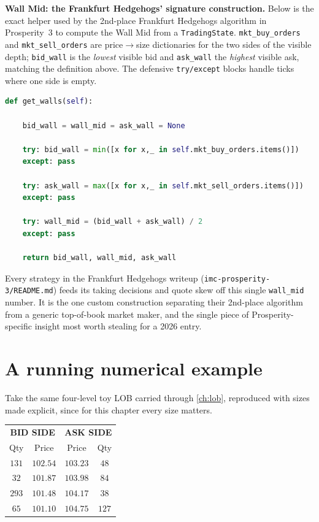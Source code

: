 \begin{prosperitybox}
\textbf{Wall Mid: the Frankfurt Hedgehogs' signature construction.}
Below is the exact helper used by the 2nd-place Frankfurt Hedgehogs
algorithm in Prosperity~3 to compute the Wall Mid from a
\texttt{TradingState}. \texttt{mkt\_buy\_orders} and
\texttt{mkt\_sell\_orders} are price$\to$size dictionaries for the
two sides of the visible depth; \texttt{bid\_wall} is the
\emph{lowest} visible bid and \texttt{ask\_wall} the \emph{highest}
visible ask, matching the definition above. The defensive
\texttt{try/except} blocks handle ticks where one side is empty.

\begin{lstlisting}[language=Python, caption={Wall Mid helper from \texttt{FrankfurtHedgehogs\_polished.py}, lines 153--166, verbatim.}]
def get_walls(self):

    bid_wall = wall_mid = ask_wall = None

    try: bid_wall = min([x for x,_ in self.mkt_buy_orders.items()])
    except: pass

    try: ask_wall = max([x for x,_ in self.mkt_sell_orders.items()])
    except: pass

    try: wall_mid = (bid_wall + ask_wall) / 2
    except: pass

    return bid_wall, wall_mid, ask_wall
\end{lstlisting}

Every strategy in the Frankfurt Hedgehogs writeup
(\texttt{imc-prosperity-3/README.md}) feeds its taking decisions and
quote skew off this single \texttt{wall\_mid} number. It is the one
custom construction separating their 2nd-place algorithm from a
generic top-of-book market maker, and the single piece of
Prosperity-specific insight most worth stealing for a 2026 entry.
\end{prosperitybox}

\section{A running numerical example}
\label{sec:running_example}

Take the same four-level toy LOB carried through \cref{ch:lob},
reproduced with sizes made explicit, since for this chapter every
size matters.

\begin{center}
\begin{tabular}{cc|cc}
\toprule
\multicolumn{2}{c|}{\textbf{BID SIDE}} & \multicolumn{2}{c}{\textbf{ASK SIDE}} \\
Qty & Price & Price & Qty \\
\midrule
$131$ & $102.54$ & $103.23$ & $48$  \\
$32$  & $101.87$ & $103.98$ & $84$  \\
$293$ & $101.48$ & $104.17$ & $38$  \\
$65$  & $101.10$ & $104.75$ & $127$ \\
\bottomrule
\end{tabular}
\end{center}

